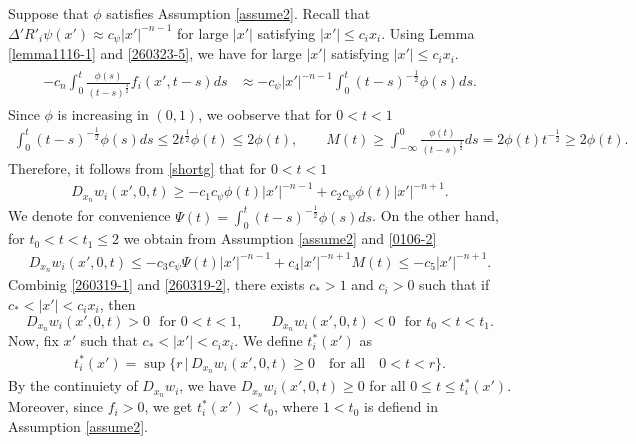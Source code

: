 \documentclass{amsart}
\numberwithin{equation}{section}
\newcommand{\De}{\Delta}
\begin{document}
Suppose that $\phi$ satisfies Assumption \ref{assume2}. 
Recall that  $\De' R'_i \psi(x') \approx c_\psi |x'|^{-n -1}$ for large $|x'|$ satisfying $ |x'| \leq c_i x_i$. Using Lemma \ref{lemma1116-1} and \eqref{260323-5},  we have for  large $|x'|$ satisfying $ |x'| \leq c_i x_i$.
\begin{align}\label{0106-2}
\begin{split}
 - c_n \int_0^t  \frac{ \phi(s)}{(t-s)^\frac32}     f_i (x', t-s) ds   %
&  \approx   -c_\psi   |x'|^{-n-1}   \int_0^t   (t -s)^{-\frac12}    \phi( s)  ds.
\end{split}
\end{align}
Since $\phi$ is increasing in $(0,1)$, we oobserve  that for $ 0 < t < 1$
\begin{align}\label{260322-1}
\int_0^t   (t -s)^{-\frac12}    \phi( s)  ds \leq 2t^\frac12 \phi(t)  \leq 2  \phi(t), \qquad 
 M(t) \geq  \int_{-\infty}^0     \frac{\phi(t) }{(t-s)^\frac32}  ds = 2\phi(t) t^{-\frac12} \geq 2\phi(t).
 \end{align}
Therefore, it follows  from \eqref{shortg} that for $ 0 < t< 1$ 
\begin{align}\label{260319-1}
D_{x_n} w_i (x',0,t) \geq    - c_1 c_\psi \phi(t)      |x'|^{-n-1} + c_2  c_\psi\phi(t)    |x'|^{-n +1}.
\end{align}
We denote for convenience $\displaystyle \Psi(t) = \int_0^t   (t -s)^{-\frac12}    \phi( s)  ds$.
On the other hand, for $ t_0< t < t_1 \leq 2$ we obtain from   Assumption \ref{assume2} and \eqref{0106-2}
 \begin{align}\label{260319-2}
D_{x_n} w_i (x',0,t) \leq    - c_3 c_\psi \Psi(t)    |x'|^{-n-1} + c_4 |x'|^{-n +1} M(t) \leq     - c_5 |x'|^{-n +1}.%
\end{align}
Combinig \eqref{260319-1} and \eqref{260319-2}, there exists $c_*> 1$ and $ c_i > 0$  such that if $ c_* < |x'| < c_i x_i$, then 
\[
D_{x_n} w_i(x', 0,t) > 0\,\,\text{ for } 0 < t< 1,\qquad D_{x_n} w_i (x',0,t) < 0\,\,\text{ for } t_0 < t<t_1.
\]
Now, fix $x'$ such that $ c_* < |x'| < c_i x_i$.  
We define $t_i^*(x')$ as  
\begin{align*}
t^*_i (x')   = \sup \{ r \, | \, D_{x_n} w_i (x', 0,t) \geq 0 \quad \mbox{for all} \quad  0 < t< r \}.
\end{align*}
By the continuiety of $ D_{x_n} w_i$, we have $ D_{x_n} w_i (x', 0,t) \geq 0$ for all $ 0\leq t \leq t_i^*(x')$. Moreover, since $ f_i > 0$,  we get  $ t_i^*(x') < t_0$, where $ 1 <t_0$ is defiend in Assumption \ref{assume2}.
\end{document}
